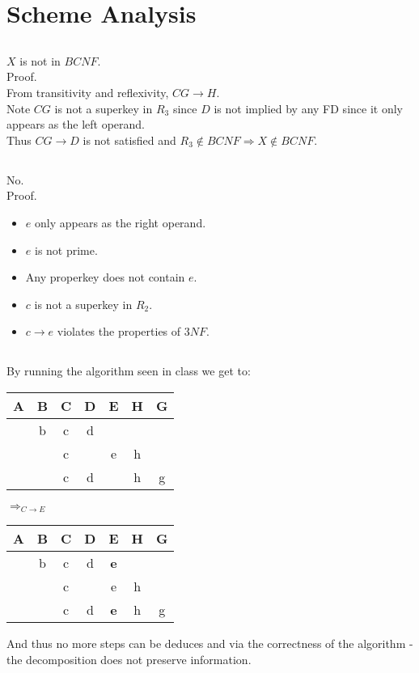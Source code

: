 \section{Scheme Analysis}
\subsection{}
$X$ is not in $BCNF$.\\
Proof.\\
From transitivity and reflexivity, $CG\rightarrow H$.\\
Note $CG$ is not a superkey in $R_3$ since $D$ is not implied
by any FD since it only appears as the left operand.\\
Thus $CG \rightarrow D$ is not satisfied and $R_3\notin BCNF \Rightarrow X\notin BCNF$.

\subsection{}
No.\\
Proof.
\begin{itemize}
	\item $e$ only appears as the right operand.
	\item $e$ is not prime.
	\item Any properkey does not contain $e$.
	\item $c$ is not a superkey in $R_2$.
	\item $c\rightarrow e$ violates the properties of $3NF$.
\end{itemize}

\subsection{}
By running the algorithm seen in class we get to:
\begin{center}
	\begin{tabular}{| c | c | c | c | c | c | c |}
		\hline
		A	&B	&C	&D	&E	&H	&G	\\
		\hline
			&b	&c	&d	&	&	&	\\
		\hline
			&	&c	&	&e	&h	&	\\
		\hline
			&	&c	&d	&	&h	&g	\\
		\hline
	\end{tabular}
	$\Longrightarrow_{C\rightarrow E}$
	\begin{tabular}{| c | c | c | c | c | c | c |}
		\hline
		A	&B	&C	&D	&E	&H	&G	\\
		\hline
			&b	&c	&d	&\textbf{e}	&	&	\\
		\hline
			&	&c	&	&e	&h	&	\\
		\hline
			&	&c	&d	&\textbf{e}	&h	&g	\\
		\hline
	\end{tabular}
\end{center}
And thus no more steps can be deduces and via the correctness of the algorithm -
the decomposition does not preserve information.

